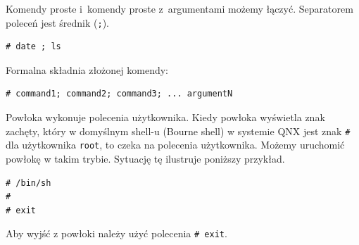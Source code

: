 \begin{example}\label{ex:prostakomenda3} 

Komendy proste i~komendy proste z~argumentami możemy łączyć. Separatorem poleceń jest średnik (\lstinline[style=MyBashStyle]{;}). 


\begin{lstlisting}[style=MyBashStyle]
# date ; ls
\end{lstlisting}

Formalna składnia złożonej komendy: 

\begin{lstlisting}[style=MyBashStyle]
# command1; command2; command3; ... argumentN
\end{lstlisting}
\end{example}

%
%
%
%
%
%
%
%
%

\begin{example}\label{ex:prostakomenda6} 


Powłoka wykonuje polecenia użytkownika. Kiedy powłoka wyświetla znak zachęty, który w domyślnym shell-u (Bourne shell) w systemie QNX jest znak \lstinline[style=MyBashStyle]{#} dla użytkownika \lstinline[style=MyBashStyle]{root}, to czeka na polecenia użytkownika. Możemy uruchomić powłokę w takim trybie. Sytuację tę ilustruje poniższy przykład.  


\begin{lstlisting}[style=MyBashStyle]
# /bin/sh
#
# exit
\end{lstlisting}

Aby wyjść z powłoki należy użyć polecenia \lstinline[style=MyBashStyle]{# exit}. 
\end{example}

